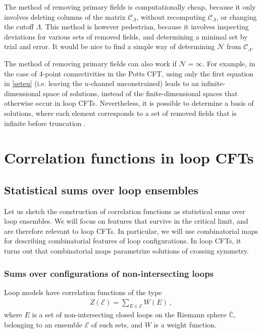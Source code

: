 \documentclass[12pt, a4paper]{article}
\begin{document}
The method of removing primary fields is computationally cheap, because it only involves deleting columns of the matrix $\mathcal{C}_\Lambda$, without recomputing $\mathcal{C}_\Lambda$, or changing the cutoff $\Lambda$. This method is however pedestrian, because it involves inspecting deviations for various sets of removed fields, and determining a minimal set by trial and error. It would be nice to find a simple way of determining $\mathcal{N}$ from $\mathcal{C}_\Lambda$.

The method of removing primary fields can also work if $\mathcal{N}=\infty$. For example, in the case of 4-point connectivities in the Potts CFT, using only the first equation in \eqref{seteu} (i.e. leaving the $u$-channel unconstrained) leads to an infinite-dimensional space of solutions, instead of the finite-dimensional spaces that otherwise occur in loop CFTs. Nevertheless, it is possible to determine a basis of solutions, where each element corresponds to a set of removed fields that is infinite before truncation \cite{nr20}.


\section{Correlation functions in loop CFTs} \label{sec:cloop}

\subsection{Statistical sums over loop ensembles}

Let us sketch the construction of correlation functions as statistical sums over loop ensembles. We will focus on features that survive in the critical limit, and are therefore relevant to loop CFTs. In particular, we will use combinatorial maps for describing combinatorial features of loop configurations. In loop CFTs, it turns out that combinatorial maps parametrize solutions of crossing symmetry.

\subsubsection{Sums over configurations of non-intersecting loops}

Loop models have correlation functions of the type
\begin{align}
 Z(\mathcal{E}) = \sum_{E\in\mathcal{E}} W(E)\ , 
\end{align}
where $E$ is a set of non-intersecting closed loops on the Riemann sphere $\overline{\mathbb{C}}$, belonging to an ensemble $\mathcal{E}$ of such sets, and $W$ is a weight function.
\end{document}
